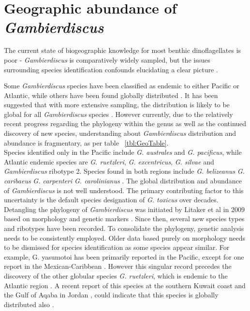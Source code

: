 \documentclass[12pt]{article}
\begin{document}
\section{Geographic abundance of \emph{Gambierdiscus}}
The current state of biogeographic knowledge for most benthic dinoflagellates is poor - \emph{Gambierdiscus} is comparatively widely sampled, but the issues surrounding species identification confounds elucidating a clear picture \cite{marine2014}.

Some \emph{Gambierdiscus} species have been classified as endemic to either Pacific or Atlantic, while others have been found globally distributed \cite{berdalet2012global,litaker2010global}. It has been suggested that with more extensive sampling, the distribution is likely to be global for all \emph{Gambierdiscus} species \cite{testerICHA}. However currently, due to the relatively recent progress regarding the phylogeny within the genus as well as the continued discovery of new species, understanding about \emph{Gambierdiscus} distribution and abundance is fragmentary, as per table ~\ref{tbl:GeoTable}. \\
Species identified only in the Pacific include \emph{G. australes} and \emph{G. pacificus}, while Atlantic endemic species are \emph{G. ruetzleri}, \emph{G. excentricus}, \emph{G. silvae} and \emph{Gambierdiscus} ribotype 2. Species found in both regions include \emph{G. belizeanus} \emph{G. caribaeus} \emph{G. carpenteri} \emph{G. carolinianus} \cite{litaker2010global,litaker2009taxonomy,berdalet2012global,fraga2014genus}. %
The global distribution and abundance of \emph{Gambierdiscus} is not well understood. The primary contributing factor to this uncertainty is the default species designation of \emph{G. toxicus} over decades. Detangling the phylogeny of \emph{Gambierdiscus} was initiated by Litaker et al in 2009 based on morphology and genetic markers \cite{litaker2009taxonomy}. Since then, several new species types and ribotypes have been recorded. To consolidate the phylogeny, genetic analysis needs to be consistently employed. Older data based purely on morphology needs to be dismissed for species identification as some species appear similar. For example, G. yasumotoi has been primarily reported in the Pacific, except for one report in the Mexican-Caribbean \cite{hernandez2004species}. However this singular record precedes the discovery of the other globular species \emph{G. ruetzleri}, which is endemic to the Atlantic region \cite{litaker2009taxonomy}. A recent report of this species at the southern Kuwait coast and the Gulf of Aqaba in Jordan \cite{saburova2013new}, could indicate that this species is globally distributed also \cite{xu2014distribution}.
\end{document}
